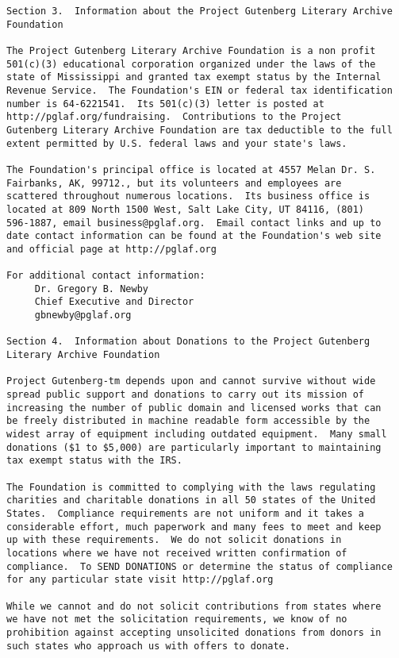 \documentclass[oneside,12pt]{book}
\begin{document}
\begin{verbatim}
Section 3.  Information about the Project Gutenberg Literary Archive
Foundation

The Project Gutenberg Literary Archive Foundation is a non profit
501(c)(3) educational corporation organized under the laws of the
state of Mississippi and granted tax exempt status by the Internal
Revenue Service.  The Foundation's EIN or federal tax identification
number is 64-6221541.  Its 501(c)(3) letter is posted at
http://pglaf.org/fundraising.  Contributions to the Project
Gutenberg Literary Archive Foundation are tax deductible to the full
extent permitted by U.S. federal laws and your state's laws.

The Foundation's principal office is located at 4557 Melan Dr. S.
Fairbanks, AK, 99712., but its volunteers and employees are
scattered throughout numerous locations.  Its business office is
located at 809 North 1500 West, Salt Lake City, UT 84116, (801)
596-1887, email business@pglaf.org.  Email contact links and up to
date contact information can be found at the Foundation's web site
and official page at http://pglaf.org

For additional contact information:
     Dr. Gregory B. Newby
     Chief Executive and Director
     gbnewby@pglaf.org

Section 4.  Information about Donations to the Project Gutenberg
Literary Archive Foundation

Project Gutenberg-tm depends upon and cannot survive without wide
spread public support and donations to carry out its mission of
increasing the number of public domain and licensed works that can
be freely distributed in machine readable form accessible by the
widest array of equipment including outdated equipment.  Many small
donations ($1 to $5,000) are particularly important to maintaining
tax exempt status with the IRS.

The Foundation is committed to complying with the laws regulating
charities and charitable donations in all 50 states of the United
States.  Compliance requirements are not uniform and it takes a
considerable effort, much paperwork and many fees to meet and keep
up with these requirements.  We do not solicit donations in
locations where we have not received written confirmation of
compliance.  To SEND DONATIONS or determine the status of compliance
for any particular state visit http://pglaf.org

While we cannot and do not solicit contributions from states where
we have not met the solicitation requirements, we know of no
prohibition against accepting unsolicited donations from donors in
such states who approach us with offers to donate.


\end{verbatim}
\end{document}
